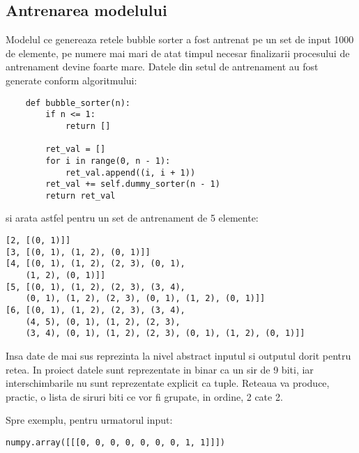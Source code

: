 \documentclass[12pt]{article}
\begin{document}
\subsection{Antrenarea modelului}

Modelul ce genereaza retele bubble sorter a fost antrenat pe un set de input 1000 de elemente, pe numere mai mari de atat timpul necesar finalizarii procesului de antrenament devine foarte mare. Datele din setul de antrenament au fost generate conform algoritmului:
\begin{lstlisting}
    def bubble_sorter(n):
        if n <= 1:
            return []

        ret_val = []
        for i in range(0, n - 1):
            ret_val.append((i, i + 1))
        ret_val += self.dummy_sorter(n - 1)
        return ret_val
\end{lstlisting}



si arata astfel pentru un set de antrenament de 5 elemente:

\begin{lstlisting}
[2, [(0, 1)]]
[3, [(0, 1), (1, 2), (0, 1)]]
[4, [(0, 1), (1, 2), (2, 3), (0, 1), 
	(1, 2), (0, 1)]]
[5, [(0, 1), (1, 2), (2, 3), (3, 4), 
	(0, 1), (1, 2), (2, 3), (0, 1), (1, 2), (0, 1)]]
[6, [(0, 1), (1, 2), (2, 3), (3, 4), 
	(4, 5), (0, 1), (1, 2), (2, 3), 
	(3, 4), (0, 1), (1, 2), (2, 3), (0, 1), (1, 2), (0, 1)]]
\end{lstlisting}

Insa date de mai sus reprezinta la nivel abstract inputul si outputul dorit pentru retea. In proiect datele sunt reprezentate in binar ca un sir de 9 biti, iar interschimbarile nu sunt reprezentate explicit ca tuple. Reteaua va produce, practic, o lista de siruri biti ce vor fi grupate, in ordine, 2 cate 2.

Spre exemplu, pentru urmatorul input:

\begin{lstlisting}
numpy.array([[[0, 0, 0, 0, 0, 0, 0, 1, 1]]])
\end{lstlisting}
\end{document}
